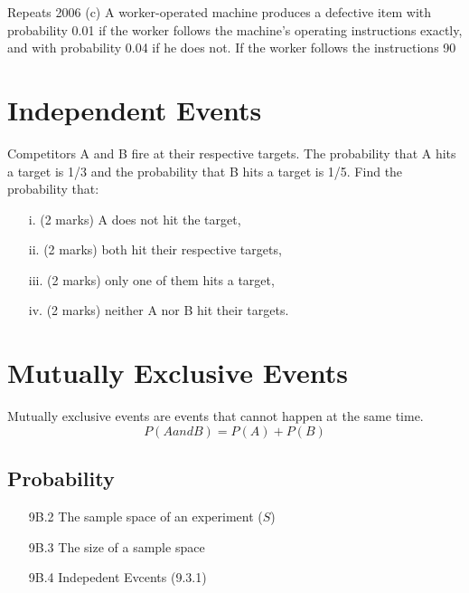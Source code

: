 \documentclass[12pt]{report}
\begin{document}
{{Repeats 2006
(c)              A worker-operated machine produces a defective item with probability 0.01 if the worker follows the machine’s operating instructions exactly, and with probability 0.04 if he does not. If the worker follows the instructions 90%



\section{Independent Events}
Competitors A and B fire at their respective targets. The probability that A hits a target is 1/3 and the probability that B hits a target is 1/5. Find the probability that:
	\begin{itemize}
		\item[i.] (2 marks) A does not hit the target,
		\item[ii.](2 marks)  both hit their respective targets,
		\item[iii.](2 marks)  only one of them hits a target,
		\item[iv.](2 marks) neither A nor B hit their targets.
	\end{itemize}
	
	
\section{Mutually Exclusive Events}
Mutually exclusive events are events that cannot happen at the same time.
\[ P(A and B) = P(A) + P(B) \]




\subsection*{Probability}
\begin{itemize}
	\item[9B.2] The sample space of an experiment ($S$)
	\item[9B.3] The size of a sample space
	\item[9B.4] Indepedent Evcents (9.3.1)
\end{itemize}
}}
\end{document}
